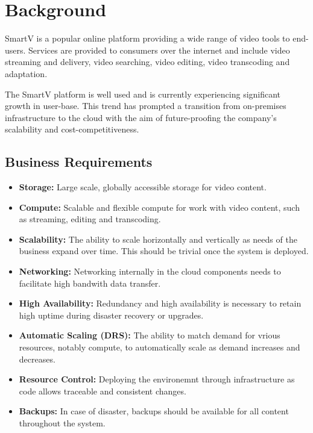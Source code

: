 \section{Background}

SmartV is a popular online platform providing a wide range of video tools to end-users. Services are provided to consumers over the internet and include video streaming and delivery, video searching, video editing, video transcoding and adaptation.

The SmartV platform is well used and is currently experiencing significant growth in user-base. This trend has prompted a transition from on-premises infrastructure to the cloud with the aim of future-proofing the company's scalability and cost-competitiveness.

\subsection{Business Requirements}

\begin{itemize}
    \item \textbf{Storage:} Large scale, globally accessible storage for video content.
    \item \textbf{Compute:} Scalable and flexible compute for work with video content, such as streaming, editing and transcoding.
    \item \textbf{Scalability:} The ability to scale horizontally and vertically as needs of the business expand over time. This should be trivial once the system is deployed.
    \item \textbf{Networking:} Networking internally in the cloud components needs to facilitate high bandwith data transfer.
    \item \textbf{High Availability:} Redundancy and high availability is necessary to retain high uptime during disaster recovery or upgrades.
    \item \textbf{Automatic Scaling (DRS):} The ability to match demand for vrious resources, notably compute, to automatically scale as demand increases and decreases.
    \item \textbf{Resource Control:} Deploying the environemnt through infrastructure as code allows traceable and consistent changes.
    \item \textbf{Backups:} In case of disaster, backups should be available for all content throughout the system.
\end{itemize}



